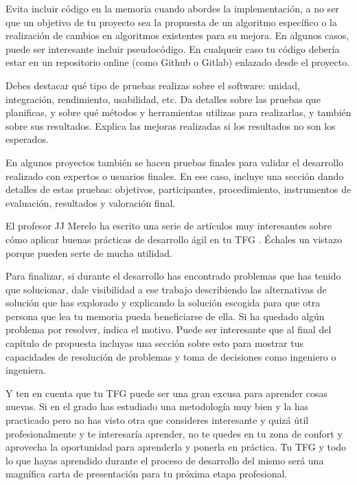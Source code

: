 Evita incluir código en la memoria cuando abordes la implementación, a no ser que un objetivo de tu proyecto sea la propuesta de un algoritmo específico o la realización de cambios en algoritmos existentes para su mejora. En algunos casos, puede ser interesante incluir pseudocódigo. En cualqueir caso tu código debería estar en un repositorio online (como Github o Gitlab) enlazado desde el proyecto.

Debes destacar qué tipo de pruebas realizas sobre el software: unidad, integración, rendimiento, usabilidad, etc. Da detalles sobre las pruebas que planificas, y sobre qué métodos y herramientas utilizas para realizarlas, y también sobre sus resultados. Explica las mejoras realizadas si los resultados no son los esperados. 

En algunos proyectos también se hacen pruebas finales para validar el desarrollo realizado con expertos o usuarios finales. En ese caso, incluye una sección dando detalles de estas pruebas: objetivos, participantes, procedimiento, instrumentos de evaluación, resultados y valoración final.

El profesor JJ Merelo ha escrito una serie de artículos muy interesantes sobre cómo aplicar buenas prácticas de desarrollo ágil en tu TFG \cite{TFGs2024JJ}. Échales un vistazo porque pueden serte de mucha utilidad. 

Para finalizar, si durante el desarrollo has encontrado problemas que has tenido que solucionar, dale visibilidad a ese trabajo describiendo las alternativas de solución que has explorado y explicando la solución escogida para que otra persona que lea tu memoria pueda beneficiarse de ella. Si ha quedado algún problema por resolver, indica el motivo. Puede ser interesante que al final del capítulo de propuesta incluyas una sección sobre esto para mostrar tus capacidades de resolución de problemas y toma de decisiones como ingeniero o ingeniera. 

Y ten en cuenta que tu TFG puede ser una gran excusa para aprender cosas nuevas. Si en el grado has estudiado una metodología muy bien y la has practicado pero no has visto otra que consideres interesante y quizá útil profesionalmente y te interesaría aprender, no te quedes en tu zona de confort y aprovecha la oportunidad para aprenderla y ponerla en práctica. Tu TFG y todo lo que hayas aprendido durante el proceso de desarrollo del mismo será una magnífica carta de presentación para tu próxima etapa profesional.
